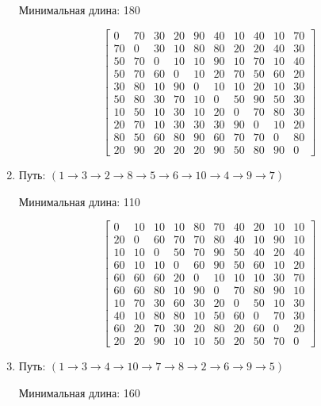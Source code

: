 \documentclass[a4paper,12pt]{article}
\begin{document}
\begin{enumerate}
	Минимальная длина: 180
	
	\[
	\begin{bmatrix}
	0& 70& 30& 20& 90& 40& 10& 40& 10& 70\\
	70& 0& 30& 10& 80& 80& 20& 20& 40& 30\\
	50& 70& 0& 10& 10& 90& 10& 70& 10& 40\\
	50& 70& 60& 0& 10& 20& 70& 50& 60& 20\\
	30& 80& 10& 90& 0& 10& 10& 20& 10& 30\\
	50& 80& 30& 70& 10& 0& 50& 90& 50& 30\\
	10& 50& 10& 30& 10& 20& 0& 70& 80& 30\\
	20& 70& 10& 30& 30& 30& 90& 0& 10& 20\\
	80& 50& 60& 80& 90& 60& 70& 70& 0& 80\\
	20& 90& 20& 20& 20& 90& 50& 80& 90& 0
	\end{bmatrix}
	\]
	
	\item
	Путь: $( 1 \rightarrow 3 \rightarrow 2 \rightarrow 8 \rightarrow 5 \rightarrow 6 \rightarrow 10 \rightarrow 4 \rightarrow 9 \rightarrow 7 )$
	
	Минимальная длина: 110
	
	\[
	\begin{bmatrix}
	0& 10& 10& 10& 80& 70& 40& 20& 10& 10\\
	20& 0& 60& 70& 70& 80& 40& 10& 90& 10\\
	10& 10& 0& 50& 70& 90& 50& 40& 20& 40\\
	60& 10& 10& 0& 60& 90& 50& 60& 10& 20\\
	60& 60& 60& 20& 0& 10& 10& 10& 30& 70\\
	60& 60& 80& 10& 90& 0& 70& 80& 90& 10\\
	10& 70& 30& 60& 30& 20& 0& 50& 10& 30\\
	40& 10& 80& 80& 10& 50& 60& 0& 70& 30\\
	60& 20& 70& 30& 20& 80& 20& 60& 0& 20\\
	20& 20& 90& 10& 10& 50& 20& 50& 70& 0
	\end{bmatrix}
	\]
	
	\item
	Путь: $( 1 \rightarrow 3 \rightarrow 4 \rightarrow 10 \rightarrow 7 \rightarrow 8 \rightarrow 2 \rightarrow 6 \rightarrow 9 \rightarrow 5 )$
	
	Минимальная длина: 160
	

\end{enumerate}
\end{document}
